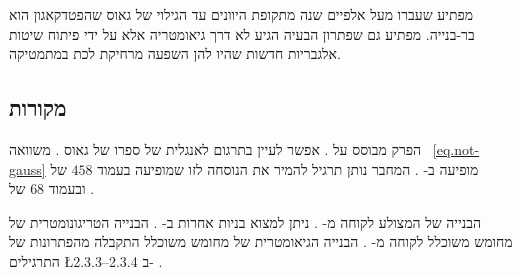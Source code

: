 מפתיע שעברו מעל אלפיים שנה מתקופת היוונים עד הגילוי של גאוס שהפטדקאגון
הוא
בר-בנייה. מפתיע גם שפתרון הבעיה הגיע לא דרך גיאומטריה אלא על ידי פיתוח שיטות אלגבריות חדשות שהיו להן השפעה מרחיקת לכת במתמטיקה.

\subsection*{מקורות}

הפרק מבוסס על
\cite{jorg}.
אפשר לעיין בתרגום לאנגלית של ספרו של גאוס 
\cite{gauss}.
משוואה%
~\ref{eq.not-gauss}
מופיעה ב-%
\cite{rike}.
המחבר נותן תרגיל להמיר את הנוסחה לזו שמופיעה בעמוד 
$458$
של
\cite{gauss}
ובעמוד
$68$
של
\cite{jorg}.


הבנייה של המצולע לקוחה מ-%
\cite{callagy}.
ניתן למצוא בניות אחרות ב-%
\cite{wiki:heptadecagon}.
הבנייה הטריגונומטרית של מחומש משוכלל לקוחה מ-%
\cite{wiki:pentagon}.
הבנייה הגיאומטרית של מחומש משוכלל התקבלה מהפתרונות של התרגילים
\L{2.3.3--2.3.4}
ב-%
\cite{stillwell}.
